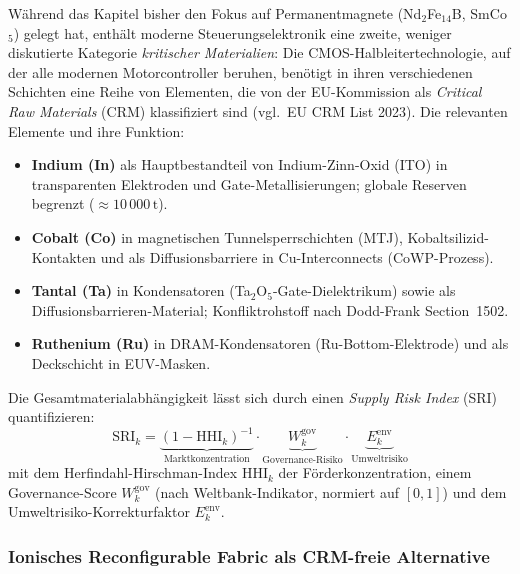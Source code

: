 ﻿\documentclass[12pt, a4paper]{report}
\theoremstyle{definition}
\theoremstyle{remark}
\begin{document}
Während das Kapitel bisher den Fokus auf Permanentmagnete
(Nd$_2$Fe$_{14}$B, SmCo$_5$) gelegt hat, enthält moderne
Steuerungselektronik eine zweite, weniger diskutierte Kategorie
\emph{kritischer Materialien}: Die CMOS-Halbleitertechnologie, auf der
alle modernen Motorcontroller beruhen, benötigt in ihren verschiedenen
Schichten eine Reihe von Elementen, die von der EU-Kommission als
\emph{Critical Raw Materials} (CRM) klassifiziert sind
(vgl.\ EU CRM List 2023). Die relevanten Elemente und ihre Funktion:
\begin{itemize}
  \item \textbf{Indium (In)} als Hauptbestandteil von
    Indium-Zinn-Oxid (ITO) in transparenten Elektroden und
    Gate-Metallisierungen; globale Reserven begrenzt ($\approx 10\,000\,\text{t}$).
  \item \textbf{Cobalt (Co)} in magnetischen Tunnelsperrschichten
    (MTJ), Kobaltsilizid-Kontakten und als Diffusionsbarriere in
    Cu-Interconnects (CoWP-Prozess).
  \item \textbf{Tantal (Ta)} in Kondensatoren (Ta$_2$O$_5$-Gate-Dielektrikum)
    sowie als Diffusionsbarrieren-Material; Konfliktrohstoff nach
    Dodd-Frank Section~1502.
  \item \textbf{Ruthenium (Ru)} in DRAM-Kondensatoren (Ru-Bottom-Elektrode)
    und als Deckschicht in EUV-Masken.
\end{itemize}
Die Gesamtmaterialabhängigkeit lässt sich durch einen
\emph{Supply Risk Index} (SRI) quantifizieren:
\begin{equation}
  \mathrm{SRI}_k
  = \underbrace{(1-\mathrm{HHI}_k)^{-1}}_{\text{Marktkonzentration}}
    \cdot
    \underbrace{W_k^{\mathrm{gov}}}_{\text{Governance-Risiko}}
    \cdot
    \underbrace{E_k^{\mathrm{env}}}_{\text{Umweltrisiko}}
  \label{eq:sri}
\end{equation}
mit dem Herfindahl-Hirschman-Index $\mathrm{HHI}_k$ der
Förderkonzentration, einem Governance-Score $W_k^{\mathrm{gov}}$
(nach Weltbank-Indikator, normiert auf $[0,1]$) und dem
Umweltrisiko-Korrektur\-faktor $E_k^{\mathrm{env}}$.

\subsubsection{Ionisches Reconfigurable Fabric als CRM-freie Alternative}
\end{document}
